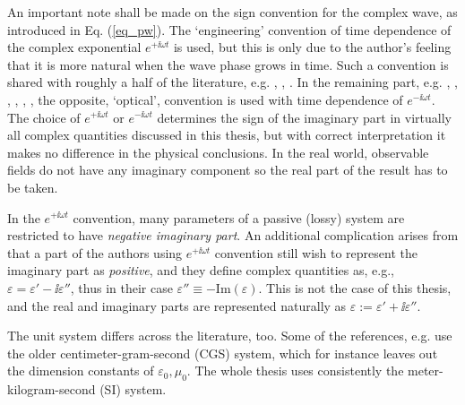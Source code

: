 An important note shall be made on the sign convention for the complex wave, as introduced in Eq. (\ref{eq_pw}).
The `engineering' convention of time dependence of the complex exponential $e^{+\ii \omega t}$ is used, but this is only due to the author's feeling that it is more natural when the wave phase grows in time. Such a convention is shared with roughly a half of the literature, e.g. \cite[p. 9]{engheta2006book}, \cite[pp. 21 and 99]{krowne2007book}, \cite[Chapters 1-4, 6, 9 and 10]{eleftheriades2005book}.  In the remaining part, e.g. \cite[chapters 5, 7, 8]{eleftheriades2005book}, \cite{klingshirn2007semiconductor}, \cite{jackson1962book}, \cite{veselago1968}, \cite{born1999book}, \cite[p. 5]{noginov2011book}, the opposite, `optical', convention is used with time dependence of $e^{-\ii \omega t}$. The choice of $e^{+\ii\omega t}$ or $e^{-\ii\omega t}$ determines the sign of the imaginary part in virtually all complex quantities discussed in this thesis, but with correct interpretation it makes no difference in the physical conclusions.
In the real world, observable fields do not have any imaginary component so the real part of the result has to be taken. 

In the $e^{+\ii\omega t}$ convention, many parameters of a passive (lossy) system are restricted to have \textit{negative imaginary part}. An additional complication arises from that a part of the authors using $e^{+\ii\omega t}$ convention still wish to represent the imaginary part as \textit{positive}, and they define complex quantities as, e.g., $\varepsilon = \varepsilon' - \ii \varepsilon''$, %
thus in their case $\varepsilon''\equiv -\text{Im}(\varepsilon)$. This is not the case of this thesis, and the real and imaginary parts are represented naturally as $\varepsilon := \varepsilon' + \ii \varepsilon''$.

The unit system differs across the literature, too. Some of the references, e.g. \cite{landau1984electrodynamics, agranovich2006spatial, krowne2007book_agran} use the older centimeter-gram-second (CGS) system, which for instance leaves out the dimension constants of $\varepsilon_0, \mu_0$. The whole thesis uses consistently the meter-kilogram-second (SI) system.

